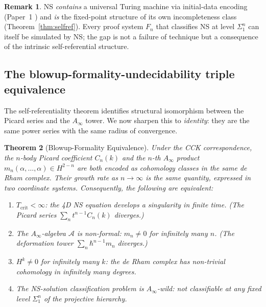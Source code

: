 \documentclass[reqno,10pt]{amsart}
\theoremstyle{plain}
\newtheorem{theorem}{Theorem}[section]
\theoremstyle{definition}
\newtheorem{remark}[theorem]{Remark}
\begin{document}
\begin{remark}
  NS \emph{contains} a universal Turing machine via initial-data encoding
  (Paper~1 \cite{Paper1}) and \emph{is} the fixed-point structure of its
  own incompleteness class (Theorem~\ref{thm:selfref}).  Every proof system
  $F_n$ that classifies NS at level $\Sigma_1^n$ can itself be simulated by
  NS; the gap is not a failure of technique but a consequence of the
  intrinsic self-referential structure.
\end{remark}

\subsection{The blowup-formality-undecidability triple equivalence}

The self-referentiality theorem identifies structural isomorphism between
the Picard series and the $A_\infty$ tower.  We now sharpen this to
\emph{identity}: they are the same power series with the same radius of
convergence.

\begin{theorem}[Blowup-Formality Equivalence]\label{thm:blowup}
  Under the CCK correspondence, the $n$-body Picard coefficient $C_n(k)$
  and the $n$-th $A_\infty$ product $m_n(\alpha,\ldots,\alpha) \in H^{2-n}$
  are both encoded as cohomology classes in the same de Rham complex.
  Their growth rate as $n\to\infty$ is the same quantity, expressed in two
  coordinate systems.  Consequently, the following are equivalent:
  \begin{enumerate}
    \item[\rm(i)] $T_{\mathrm{crit}} < \infty$: the 4D NS equation develops
          a singularity in finite time.
          (The Picard series $\sum_n t^{n-1} C_n(k)$ diverges.)
    \item[\rm(ii)] The $A_\infty$-algebra $\mathcal{A}$ is non-formal:
          $m_n \neq 0$ for infinitely many $n$.
          (The deformation tower $\sum_n \hbar^{n-1} m_n$ diverges.)
    \item[\rm(iii)] $H^k \neq 0$ for infinitely many $k$: the de Rham
          complex has non-trivial cohomology in infinitely many degrees.
    \item[\rm(iv)] The NS-solution classification problem is
          $A_\infty$-wild: not classifiable at any fixed level
          $\Sigma_1^n$ of the projective hierarchy.
  \end{enumerate}
\end{theorem}
\end{document}
